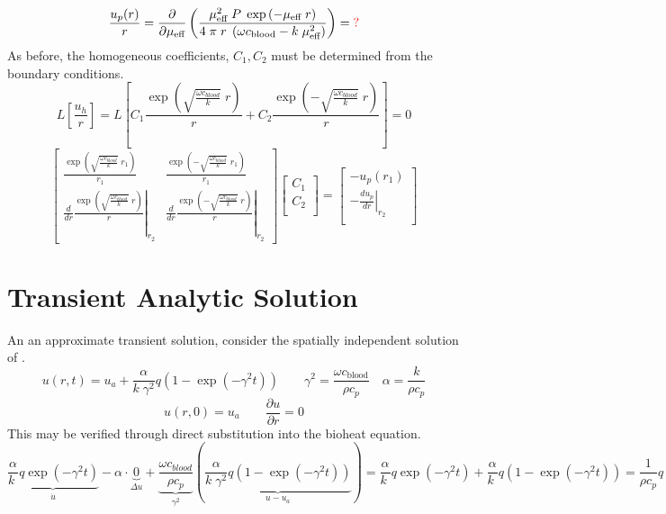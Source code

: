 \documentclass{article}         %
\theoremstyle{definition}
\theoremstyle{remark}
\begin{document}
\[
  \frac{u_p(r)}{r} = 
    \frac{\partial }{\partial \mu_\text{eff}}
   \left(
    \frac{\mu_\text{eff}^2 \; P \; \exp \left(-\mu_\text{eff} \; r \right) }
         { 4 \; \pi \; r \; \left(\omega c_\text{blood}-k \; \mu_\text{eff}^2 \right)} 
   \right)
   = \text{\color{red}?}
\]
As before, the homogeneous coefficients, $C_1, C_2$ must be determined from the 
boundary conditions.
\[
  L \left[\frac{u_h}{r} \right] =   
 L\left[
    C_1 \frac{\exp\left( \sqrt{\frac{\omega c_\textit{blood}}{k}} \; r \right)}{r}  
  + 
    C_2 \frac{\exp\left(-\sqrt{\frac{\omega c_\textit{blood}}{k}} \; r \right)}{r}  
\right]
  = 0
\]
\[
\begin{bmatrix}
    \frac{\exp\left( \sqrt{\frac{\omega c_\textit{blood}}{k}} \; r_1 \right)}{r_1}  
  & 
    \frac{\exp\left(-\sqrt{\frac{\omega c_\textit{blood}}{k}} \; r_1 \right)}{r_1}  
  \\
  \left.
   \frac{d}{dr}
    \frac{\exp\left( \sqrt{\frac{\omega c_\textit{blood}}{k}} \; r \right)}{r}  
  \right|_{r_2}
  & 
  \left.
   \frac{d}{dr}
    \frac{\exp\left(-\sqrt{\frac{\omega c_\textit{blood}}{k}} \; r \right)}{r}  
  \right|_{r_2}
\end{bmatrix}
\begin{bmatrix}
  C_1 \\
  C_2 \\
\end{bmatrix}
= 
\begin{bmatrix}
       - u_p(r_1)     \\
  - \left. \frac{d u_p}{dr} 
  \right|_{r_2}\\
\end{bmatrix}
\]
\section{Transient Analytic Solution}

An an approximate transient solution, consider the spatially independent
solution of \cite{Giordano2010}.
\[
 u(r,t) = u_a + \frac{\alpha}{k\; \gamma^2} q \left( 1 - \exp(-\gamma^2 t)\right)
 \qquad
  \gamma^2 = \frac{\omega c_\text{blood}}{\rho c_p}
 \quad
  \alpha  = \frac{k}{\rho c_p}
\]
\[
 u(r,0) = u_a 
 \qquad
 \frac{\partial u}{\partial r} = 0 
\]
This may be verified through direct substitution into the bioheat equation.
\[
 \underbrace{\frac{\alpha}{k\; } q  \exp(-\gamma^2 t)}_{\dot{u} }
 -  \alpha  \cdot
\underbrace{ 0}_{\Delta u }
 + 
\underbrace{ 
  \frac{\omega c_\textit{blood}}{\rho c_p} 
  }_{\gamma^2 }
  \left(
 \underbrace{
  \frac{\alpha}{k\; \gamma^2} q \left( 1 - \exp(-\gamma^2 t)\right)
   }_{u  - u_a }
   \right)
  = 
 \frac{\alpha}{k\; } q  \exp(-\gamma^2 t)
  +
 \frac{\alpha}{k\; } q 
      \left( 1 - \exp(-\gamma^2 t)\right)
  = 
 \frac{1}{\rho c_p } q 
\]
\end{document}
